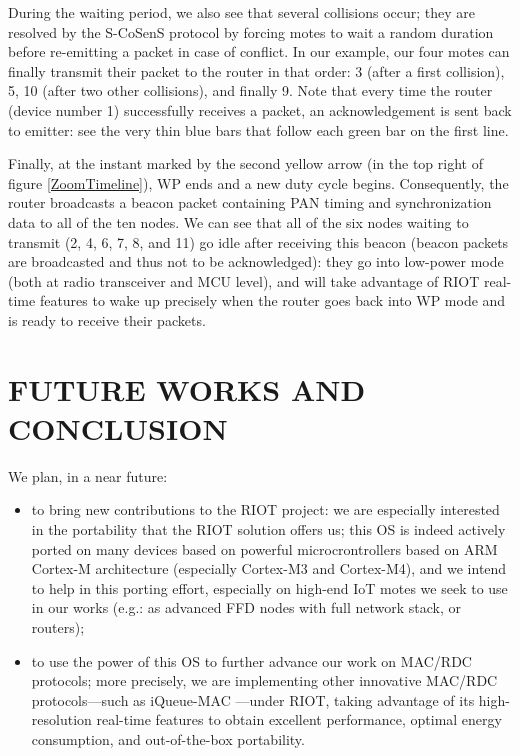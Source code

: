 \documentclass[a4paper,twoside]{article}
\begin{document}
During the waiting period, we also see that several collisions occur; they
are resolved by the S-CoSenS protocol by forcing motes to wait a random
duration before re-emitting a packet in case of conflict. In our example,
our four motes can finally transmit their packet to the router in that
order: \textsf{3} (after a first collision), \textsf{5}, \textsf{10} (after
two other collisions), and finally \textsf{9}. Note that every time the
router (device number \textsf{1}) successfully receives a packet, an
acknowledgement is sent back to emitter: see the very thin blue bars that
follow each green bar on the first line.

Finally, at the instant marked by the second yellow arrow (in the top right
of figure \ref{ZoomTimeline}), WP ends and a new duty cycle begins.
Consequently, the router broadcasts a beacon packet containing PAN timing and
synchronization data to all of the ten nodes. We can see that all of the
six nodes waiting to transmit (\textsf{2}, \textsf{4}, \textsf{6}, \textsf{7},
\textsf{8}, and \textsf{11}) go idle after receiving this beacon (beacon
packets are broadcasted and thus not to be acknowledged): they go
into low-power mode (both at radio transceiver and MCU level), and will
take advantage of RIOT real-time features to wake up precisely when
the router goes back into WP mode and is ready to receive their
packets.



\section{\uppercase{Future Works and Conclusion}}

We plan, in a near future:

\begin{itemize}

\item to bring new contributions to the RIOT project: we are especially
      interested in the portability that the RIOT solution offers us;
      this OS is indeed actively ported on many devices based on powerful
      microcrontrollers based on ARM Cortex-M architecture (especially
      Cortex-M3 and Cortex-M4), and we intend to help in this porting
      effort, especially on high-end IoT motes we seek to use in our
      works (e.g.: as advanced FFD nodes with full network stack,
      or routers);

\item to use the power of this OS to further advance our work on MAC/RDC
      protocols; more precisely, we are implementing other innovative
      MAC/RDC protocols---such as iQueue-MAC \cite{iQueueMAC}---under RIOT,
      taking advantage of its high-resolution real-time features to obtain
      excellent performance, optimal energy consumption, and out-of-the-box
      portability.

\end{itemize}
\end{document}
